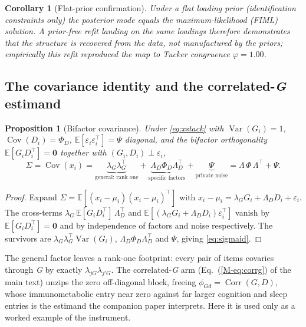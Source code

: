 \documentclass[11pt]{article}
\newcommand{\Gfac}{\textit{G}}
\newcommand{\eED}{\mathbb{E}}
\theoremstyle{plain}
\newtheorem{proposition}{Proposition}
\newtheorem{corollary}{Corollary}
\theoremstyle{definition}
\newcommand{\MEq}[1]{Eq.~(\ref{M-#1})}
\begin{document}
\begin{corollary}[Flat-prior confirmation]\label{cor:flat}
Under a flat loading prior (identification constraints only) the posterior mode equals the
maximum-likelihood (FIML) solution. A prior-free refit landing on the same loadings
therefore demonstrates that the structure is recovered from the data, not manufactured by
the priors; empirically this refit reproduced the map to Tucker congruence $\varphi=1.00$.
\end{corollary}

\subsection{The covariance identity and the correlated-\texorpdfstring{\Gfac}{G} estimand}
\label{sub:sigma}

\begin{proposition}[Bifactor covariance]\label{prop:sigma}
Under \eqref{eq:xstack} with $\operatorname{Var}(G_i)=1$,
$\operatorname{Cov}(D_i)=\Phi_D$, $\eED[\varepsilon_i\varepsilon_i^\top]=\Psi$ diagonal,
and the bifactor orthogonality $\eED[G_iD_i^\top]=\mathbf 0$ together with
$(G_i,D_i)\perp\varepsilon_i$,
\begin{equation}
  \Sigma=\operatorname{Cov}(x_i)
  =\underbrace{\lambda_G\lambda_G^{\top}}_{\text{general: rank one}}
  +\underbrace{\Lambda_D\Phi_D\Lambda_D^{\top}}_{\text{specific factors}}
  +\underbrace{\Psi}_{\text{private noise}}
  =\Lambda\,\Phi\,\Lambda^{\top}+\Psi .
  \label{eq:sigmaid}
\end{equation}
\end{proposition}
\begin{proof}
Expand $\Sigma=\eED[(x_i-\mu_i)(x_i-\mu_i)^\top]$ with
$x_i-\mu_i=\lambda_G G_i+\Lambda_D D_i+\varepsilon_i$. The cross-terms
$\lambda_G\,\eED[G_iD_i^\top]\,\Lambda_D^\top$ and
$\eED[(\lambda_GG_i+\Lambda_DD_i)\varepsilon_i^\top]$ vanish by
$\eED[G_iD_i^\top]=\mathbf 0$ and by independence of factors and noise respectively. The
survivors are $\lambda_G\lambda_G^\top\operatorname{Var}(G_i)$, $\Lambda_D\Phi_D\Lambda_D^\top$
and $\Psi$, giving \eqref{eq:sigmaid}.
\end{proof}
\noindent
The general factor leaves a rank-one footprint: every pair of items covaries through \Gfac{}
by exactly $\lambda_{jG}\lambda_{j'G}$. The correlated-\Gfac{} arm (\MEq{eq:corrg} of the
main text) unzips the zero off-diagonal block, freeing
$\phi_{Gd}=\operatorname{Corr}(G,D)$, whose immunometabolic entry near zero against far
larger cognition and sleep entries is the estimand the companion paper interprets. Here it
is used only as a worked example of the instrument.
\end{document}
